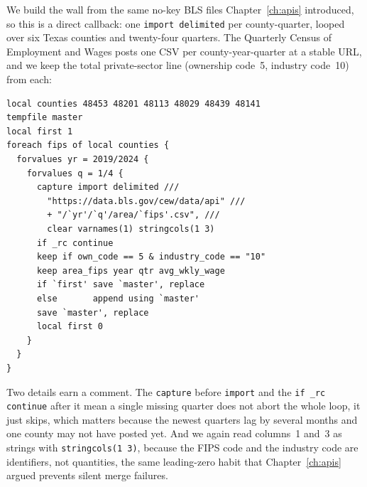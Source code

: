 \documentclass[
    a4paper,
    fontsize=10pt,
    twoside=true,
    numbers=noenddot,
]{kaobook}
\begin{document}
We build the wall from the same no-key BLS files Chapter~\ref{ch:apis} introduced, so this is a direct callback: one \texttt{import delimited} per county-quarter, looped over six Texas counties and twenty-four quarters. The Quarterly Census of Employment and Wages posts one CSV per county-year-quarter at a stable URL, and we keep the total private-sector line (ownership code~5, industry code~10) from each:
{\footnotesize
\begin{verbatim}
local counties 48453 48201 48113 48029 48439 48141
tempfile master
local first 1
foreach fips of local counties {
  forvalues yr = 2019/2024 {
    forvalues q = 1/4 {
      capture import delimited ///
        "https://data.bls.gov/cew/data/api" ///
        + "/`yr'/`q'/area/`fips'.csv", ///
        clear varnames(1) stringcols(1 3)
      if _rc continue
      keep if own_code == 5 & industry_code == "10"
      keep area_fips year qtr avg_wkly_wage
      if `first' save `master', replace
      else       append using `master'
      save `master', replace
      local first 0
    }
  }
}
\end{verbatim}
}
Two details earn a comment. The \texttt{capture} before \texttt{import} and the \texttt{if \_rc continue} after it mean a single missing quarter does not abort the whole loop, it just skips, which matters because the newest quarters lag by several months and one county may not have posted yet. And we again read columns~1 and~3 as strings with \texttt{stringcols(1 3)}, because the FIPS code and the industry code are identifiers, not quantities, the same leading-zero habit that Chapter~\ref{ch:apis} argued prevents silent merge failures.
\end{document}

